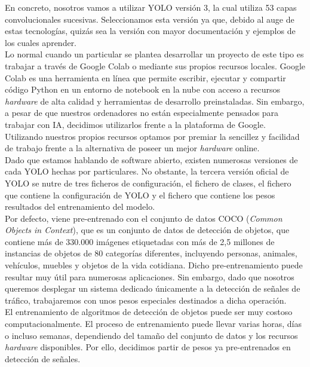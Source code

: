En concreto, nosotros vamos a utilizar YOLO versión 3, la cual utiliza 53 capas convolucionales sucesivas. Seleccionamos esta versión ya que, debido al auge de estas tecnologías, quizás sea la versión con mayor documentación y ejemplos de los cuales aprender.\\

Lo normal cuando un particular se plantea desarrollar un proyecto de este tipo es trabajar a través de Google Colab o mediante sus propios recursos locales. Google Colab es una herramienta en línea que permite escribir, ejecutar y compartir código Python en un entorno de notebook en la nube con acceso a recursos \textit{hardware} de alta calidad y herramientas de desarrollo preinstaladas. Sin embargo, a pesar de que nuestros ordenadores no están especialmente pensados para trabajar con IA, decidimos utilizarlos frente a la plataforma de Google. Utilizando nuestros propios recursos optamos por premiar la sencillez y facilidad de trabajo frente a la alternativa de poseer un mejor \textit{hardware} online.\\

Dado que estamos hablando de software abierto, existen numerosas versiones de cada YOLO hechas por particulares. No obstante, la tercera versión oficial de YOLO se nutre de tres ficheros de configuración, el fichero de clases, el fichero que contiene la configuración de YOLO y el fichero que contiene los pesos resultados del entrenamiento del modelo.\\

Por defecto, viene pre-entrenado con el conjunto de datos COCO (\textit{Common Objects in Context}), que es un conjunto de datos de detección de objetos, que contiene más de 330.000 imágenes etiquetadas con más de 2,5 millones de instancias de objetos de 80 categorías diferentes, incluyendo personas, animales, vehículos, muebles y objetos de la vida cotidiana. Dicho pre-entrenamiento puede resultar muy útil para numerosas aplicaciones. Sin embargo, dado que nosotros queremos desplegar un sistema dedicado únicamente a la detección de señales de tráfico, trabajaremos con unos pesos especiales destinados a dicha operación.\\

El entrenamiento de algoritmos de detección de objetos puede ser muy costoso computacionalmente. El proceso de entrenamiento puede llevar varias horas, días o incluso semanas, dependiendo del tamaño del conjunto de datos y los recursos \textit{hardware} disponibles. Por ello, decidimos partir de pesos ya pre-entrenados en detección de señales.\\

